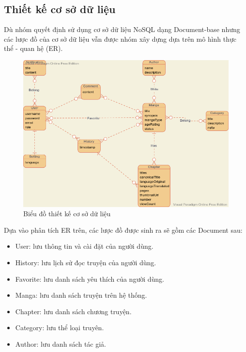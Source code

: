 \documentclass[./../main.tex]{subfiles}
\begin{document}
\subsection{Thiết kế cơ sở dữ liệu}
Dù nhóm quyết định sử dụng cơ sở dữ liệu NoSQL dạng Document-base nhưng các lược đồ của cơ sở dữ liệu vẫn được nhóm xây dựng dựa trên mô hình thực thể - quan hệ (ER).
\begin{figure}[H]
	\centering
	\includegraphics[width=\linewidth]{./images/image8.png}
	\caption{Biểu đồ thiết kế cơ sở dữ liệu}
\end{figure}
Dựa vào phân tích ER trên, các lược đồ được sinh ra sẽ gồm các Document sau:
\begin{itemize}
	\item User: lưu thông tin và cài đặt của người dùng.
	\item History: lưu lịch sử đọc truyện của người dùng.
	\item Favorite: lưu danh sách yêu thích của người dùng.
	\item Manga: lưu danh sách truyện trên hệ thống.
	\item Chapter: lưu danh sách chương truyện.
	\item Category: lưu thể loại truyên.
	\item Author: lưu danh sách tác giả.
\end{itemize}
\end{document}
